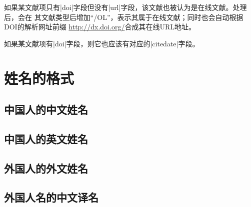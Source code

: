 如果某文献项只有|doi|字段但没有|url|字段，该文献也被认为是在线文献。{\BibTeX}处理后，会在
其文献类型后增加``/OL''，表示其属于在线文献；同时也会自动根据DOI的解析网址前缀
\url{http://dx.doi.org/}合成其在线URL地址。

如果某文献项有|doi|字段，则它也应该有对应的|citedate|字段。


\section{姓名的格式}\label{sec:names}

\subsection{中国人的中文姓名}

\subsection{中国人的英文姓名}

\subsection{外国人的外文姓名}

\subsection{外国人名的中文译名}


